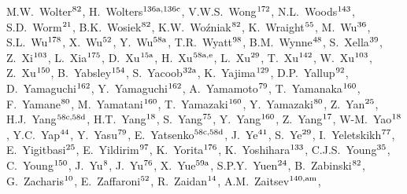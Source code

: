 \begin{flushleft}
M.W.~Wolter$^\textrm{\scriptsize 82}$,    
H.~Wolters$^\textrm{\scriptsize 136a,136c}$,    
V.W.S.~Wong$^\textrm{\scriptsize 172}$,    
N.L.~Woods$^\textrm{\scriptsize 143}$,    
S.D.~Worm$^\textrm{\scriptsize 21}$,    
B.K.~Wosiek$^\textrm{\scriptsize 82}$,    
K.W.~Wo\'{z}niak$^\textrm{\scriptsize 82}$,    
K.~Wraight$^\textrm{\scriptsize 55}$,    
M.~Wu$^\textrm{\scriptsize 36}$,    
S.L.~Wu$^\textrm{\scriptsize 178}$,    
X.~Wu$^\textrm{\scriptsize 52}$,    
Y.~Wu$^\textrm{\scriptsize 58a}$,    
T.R.~Wyatt$^\textrm{\scriptsize 98}$,    
B.M.~Wynne$^\textrm{\scriptsize 48}$,    
S.~Xella$^\textrm{\scriptsize 39}$,    
Z.~Xi$^\textrm{\scriptsize 103}$,    
L.~Xia$^\textrm{\scriptsize 175}$,    
D.~Xu$^\textrm{\scriptsize 15a}$,    
H.~Xu$^\textrm{\scriptsize 58a,e}$,    
L.~Xu$^\textrm{\scriptsize 29}$,    
T.~Xu$^\textrm{\scriptsize 142}$,    
W.~Xu$^\textrm{\scriptsize 103}$,    
Z.~Xu$^\textrm{\scriptsize 150}$,    
B.~Yabsley$^\textrm{\scriptsize 154}$,    
S.~Yacoob$^\textrm{\scriptsize 32a}$,    
K.~Yajima$^\textrm{\scriptsize 129}$,    
D.P.~Yallup$^\textrm{\scriptsize 92}$,    
D.~Yamaguchi$^\textrm{\scriptsize 162}$,    
Y.~Yamaguchi$^\textrm{\scriptsize 162}$,    
A.~Yamamoto$^\textrm{\scriptsize 79}$,    
T.~Yamanaka$^\textrm{\scriptsize 160}$,    
F.~Yamane$^\textrm{\scriptsize 80}$,    
M.~Yamatani$^\textrm{\scriptsize 160}$,    
T.~Yamazaki$^\textrm{\scriptsize 160}$,    
Y.~Yamazaki$^\textrm{\scriptsize 80}$,    
Z.~Yan$^\textrm{\scriptsize 25}$,    
H.J.~Yang$^\textrm{\scriptsize 58c,58d}$,    
H.T.~Yang$^\textrm{\scriptsize 18}$,    
S.~Yang$^\textrm{\scriptsize 75}$,    
Y.~Yang$^\textrm{\scriptsize 160}$,    
Z.~Yang$^\textrm{\scriptsize 17}$,    
W-M.~Yao$^\textrm{\scriptsize 18}$,    
Y.C.~Yap$^\textrm{\scriptsize 44}$,    
Y.~Yasu$^\textrm{\scriptsize 79}$,    
E.~Yatsenko$^\textrm{\scriptsize 58c,58d}$,    
J.~Ye$^\textrm{\scriptsize 41}$,    
S.~Ye$^\textrm{\scriptsize 29}$,    
I.~Yeletskikh$^\textrm{\scriptsize 77}$,    
E.~Yigitbasi$^\textrm{\scriptsize 25}$,    
E.~Yildirim$^\textrm{\scriptsize 97}$,    
K.~Yorita$^\textrm{\scriptsize 176}$,    
K.~Yoshihara$^\textrm{\scriptsize 133}$,    
C.J.S.~Young$^\textrm{\scriptsize 35}$,    
C.~Young$^\textrm{\scriptsize 150}$,    
J.~Yu$^\textrm{\scriptsize 8}$,    
J.~Yu$^\textrm{\scriptsize 76}$,    
X.~Yue$^\textrm{\scriptsize 59a}$,    
S.P.Y.~Yuen$^\textrm{\scriptsize 24}$,    
B.~Zabinski$^\textrm{\scriptsize 82}$,    
G.~Zacharis$^\textrm{\scriptsize 10}$,    
E.~Zaffaroni$^\textrm{\scriptsize 52}$,    
R.~Zaidan$^\textrm{\scriptsize 14}$,    
A.M.~Zaitsev$^\textrm{\scriptsize 140,am}$,    

\end{flushleft}

